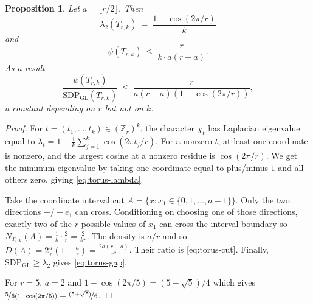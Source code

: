 \documentclass[11pt]{article}
\newtheorem{proposition}[theorem]{Proposition}
\theoremstyle{definition}
\theoremstyle{remark}
\newcommand{\Z}{\mathbb{Z}}
\newcommand{\gl}{\operatorname{SDP_{GL}}}
\begin{document}
\begin{proposition}
\label{prop:torus}
Let $a=\lfloor r/2\rfloor$. Then
\begin{equation}\label{eq:torus-lambda}
  \lambda_2(T_{r,k}) ~=~ \frac{1-\cos(2\pi/r)}{k}
\end{equation}
and
\begin{equation}\label{eq:torus-cut}
  \psi(T_{r,k}) ~\leq~ \frac{r}{k \cdot a(r-a)}.
\end{equation}
As a result
\begin{equation}\label{eq:torus-gap}
  \frac{\psi(T_{r,k})}{\gl(T_{r,k})}
  ~\leq~
  \frac{r}{a(r-a)(1-\cos(2\pi/r))},
\end{equation}
a constant depending on $r$ but not on $k$. 
\end{proposition}

\begin{proof}
For $t=(t_1,\ldots,t_k)\in(\Z_r)^k$, the character $\chi_t$ has Laplacian eigenvalue equal to $\lambda_t = 1-\frac{1}{k}\sum_{j=1}^k\cos(2\pi t_j/r)$.
For a nonzero $t$, at least one coordinate is nonzero, and the largest cosine at a nonzero residue is $\cos(2\pi/r)$. We get the minimum eigenvalue by taking one coordinate equal to plus/minus $1$ and all others zero, giving \eqref{eq:torus-lambda}.

Take the coordinate interval cut $A=\{x:x_1\in\{0,1,\ldots,a-1\}\}$. 
Only the two directions $+/- e_1$ can cross. Conditioning on choosing one of those directions, exactly two of the $r$ possible values of $x_1$ can cross the interval boundary so $N_{T_{r,k}}(A)=\frac1k\cdot\frac2r=\frac{2}{kr}$. The density is $a/r$ and so $D(A)=2\frac{a}{r} \left(1-\frac{a}{r} \right)=\frac{2a(r-a)}{r^2}$. Their ratio is \eqref{eq:torus-cut}. Finally, $\gl \geq  \lambda_2$ gives \eqref{eq:torus-gap}.

For $r=5$, $a=2$ and $1-\cos(2\pi/5)=(5-\sqrt5)/4$ which gives $\nicefrac{5}{6(1-\cos(2\pi/5))}=\nicefrac{(5+\sqrt5)}{6}$.
\end{proof}


\end{document}
